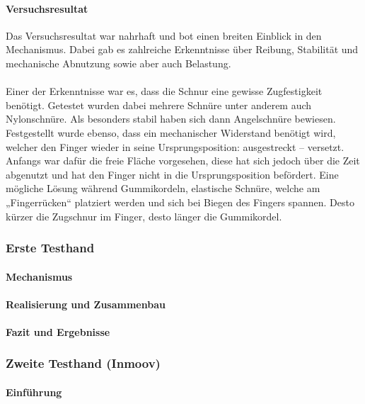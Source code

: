 \documentclass[titlepage,12pt,twoside]{article}
\begin{document}
\paragraph{Versuchsresultat}
\hfill \break
\hfill \break
Das Versuchsresultat war nahrhaft und bot einen breiten Einblick in den Mechanismus. 
Dabei gab es zahlreiche Erkenntnisse über Reibung, Stabilität und mechanische Abnutzung 
sowie aber auch Belastung. \\
\\
Einer der Erkenntnisse war es, dass die Schnur eine gewisse Zugfestigkeit benötigt. 
Getestet wurden dabei mehrere Schnüre unter anderem auch Nylonschnüre. Als besonders 
stabil haben sich dann Angelschnüre bewiesen.
Festgestellt wurde ebenso, dass ein mechanischer Widerstand benötigt wird, welcher den 
Finger wieder in seine Ursprungsposition: ausgestreckt – versetzt. Anfangs war dafür 
die freie Fläche vorgesehen, diese hat sich jedoch über die Zeit abgenutzt und hat den 
Finger nicht in die Ursprungsposition befördert. Eine mögliche Lösung während 
Gummikordeln, elastische Schnüre, welche am „Fingerrücken“ platziert werden und sich 
bei Biegen des Fingers spannen. Desto kürzer die Zugschnur im Finger, desto länger die 
Gummikordel. \\

\subsubsection{Erste Testhand}
\paragraph{Mechanismus}
\hfill \break
\hfill \break

\paragraph{Realisierung und Zusammenbau}
\hfill \break
\hfill \break

\paragraph{Fazit und Ergebnisse}
\hfill \break
\hfill \break

\subsubsection{Zweite Testhand (Inmoov)}
\paragraph{Einführung}
\hfill \break
\hfill \break
\end{document}
